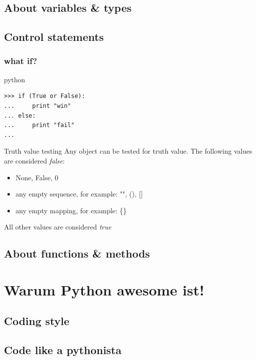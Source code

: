 \documentclass{beamer}
\begin{document}
\subsection{About variables \& types}

\subsection{Control statements}
\begin{frame}[fragile]
    \frametitle{what if?}
    
    \begin{exampleblock}{python}
    \begin{lstlisting}
>>> if (True or False):
...     print "win"
... else:
...     print "fail"
...
    \end{lstlisting}
    \end{exampleblock}

    \begin{block}{Truth value testing}
    Any object can be tested for truth value. The following values are considered \emph{false}:
    \begin{itemize}
        \item None, False, 0
        \item any empty sequence, for example: "", (), []
        \item any empty mapping, for example: \{\}
    \end{itemize}
    All other values are considered \emph{true}
    \end{block}
\end{frame}

\subsection{About functions \& methods}

\section{Warum Python awesome ist!}
\subsection{Coding style}
\subsection{Code like a pythonista} 
\end{document}
